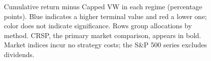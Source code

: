 \begin{figure}[t]
\caption{Cumulative return minus Capped VW in each regime (percentage points). Blue indicates a higher terminal value and red a lower one; color does not indicate significance. Rows group allocations by method. CRSP, the primary market comparison, appears in bold. Market indices incur no strategy costs; the S\&P 500 series excludes dividends.}
\label{fig:regime_heatmap}
\end{figure}
